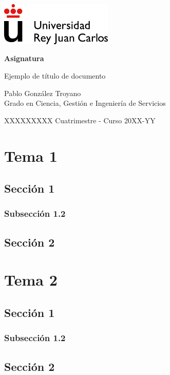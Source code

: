 \documentclass[10pt, a4paper]{book}
\newcommand\asignatura{Asignatura}
\newcommand\DocumentTitle{Ejemplo de título de documento}
\newcommand\mesyanno{XXXXXXXXX Cuatrimestre - Curso 20XX-YY}
\newcommand\autor{Pablo González Troyano}
\newcommand\grado{Grado en Ciencia, Gestión e Ingeniería de Servicios}
\begin{document}
\begin{titlepage}
\includegraphics[width=0.4\textwidth]{URJC_logo.png}
    \begin{center}
        \vspace*{7cm}  
        \Huge
        \textbf{\asignatura}
        
        \vspace{1cm}
        
        \huge{\DocumentTitle}
        \vspace{1.5cm}
        \Large
        \vfill    
        \vspace{1cm}
        \Large
    \end{center}
    {\parindent0pt \autor \\ \grado }
    \begin{flushright}
        \mesyanno
    \end{flushright}
\end{titlepage}


\setcounter{tocdepth}{4}
\let\cleardoublepage\clearpage
\tableofcontents\newpage

\newpage

\chapter{Tema 1}
    \lipsum[1-5]
    \section{Sección 1}
        \lipsum[1-5]
    \subsection{Subsección 1.2}
        \lipsum[1-5]
    \section{Sección 2}
        \lipsum[1-5]

\chapter{Tema 2}
    \lipsum[1-5]
    \section{Sección 1}
        \lipsum[1-5]
    \subsection{Subsección 1.2}
        \lipsum[1-5]
    \section{Sección 2}
        \lipsum[1-5]

\end{document}
